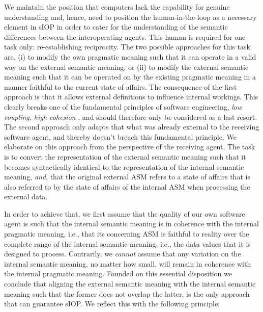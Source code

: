 \documentclass[sort&compress,preprint,authoryear,3p,twocolumn]{elsarticle}
\begin{document}
We maintain the position that computers lack the capability for genuine
understanding and, hence, need to position the human-in-the-loop as a
necessary element in sIOP in order to cater for the understanding of the
semantic differences between the interoperating agents. This human is
required for one task only: re-establishing reciprocity. The two
possible approaches for this task are, (i) to modify the own pragmatic
meaning such that it can operate in a valid way on the external semantic
meaning, or (ii) to modify the external semantic meaning such that it
can be operated on by the existing pragmatic meaning in a manner
faithful to the current state of affairs. The consequence of the first
approach is that it allows external definitions to influence internal
workings. This clearly breaks one of the fundamental principles of
software engineering, \emph{low coupling, high cohesion}
\citep[e.g.,][]{Hitz1995}, and should therefore only be considered as a
last resort. The second approach only adapts that what was already
external to the receiving software agent, and thereby doesn't breach
this fundamental principle. We elaborate on this approach from the
perspective of the receiving agent. The task is to convert the
representation of the external semantic meaning such that it becomes
syntactically identical to the representation of the internal semantic
meaning, \emph{and}, that the original external ASM refers to a state of
affairs that is also referred to by the state of affairs of the internal
ASM when processing the external data.

In order to achieve that, we first assume that the quality of our own
software agent is such that the internal semantic meaning is in
coherence with the internal pragmatic meaning, i.e., that its concerning
ASM is faithful to reality over the complete range of the internal
semantic meaning, i.e., the data values that it is designed to process.
Contrarily, we \emph{cannot} assume that any variation on the internal
semantic meaning, no matter how small, will remain in coherence with the
internal pragmatic meaning. Founded on this essential disposition we
conclude that aligning the external semantic meaning with the internal
semantic meaning such that the former does not overlap the latter, is
the only approach that can guarantee sIOP. We reflect this with the
following principle:
\end{document}
